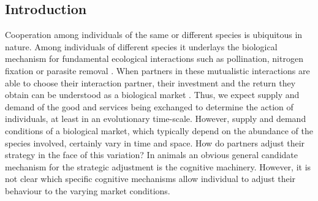 \documentclass[]{rsos}%
\begin{document}
\maketitle

\hypertarget{introduction}{%
\subsection{Introduction}\label{introduction}}

Cooperation among individuals of the same or different species is
ubiquitous in nature. Among individuals of different species it
underlays the biological mechanism for fundamental ecological
interactions such as pollination, nitrogen fixation or parasite removal
\citep{begon_Ecology_2006}. When partners in these mutualistic interactions
are able to choose their interaction partner, their investment and the
return they obtain can be understood as a biological market
\citep{hammerstein_Biological_2016, leimar_Cooperation_2010, noe_Biological_1994a, noe_Biological_1995a}. Thus, we expect supply
and demand of the good and services being exchanged to determine the
action of individuals, at least in an evolutionary time-scale. However,
supply and demand conditions of a biological market, which typically
depend on the abundance of the species involved, certainly vary in time
and space. How do partners adjust their strategy in the face of this
variation? In animals an obvious general candidate mechanism for the
strategic adjustment is the cognitive machinery. However, it is not
clear which specific cognitive mechanisms allow individual to adjust
their behaviour to the varying market conditions.
\end{document}
